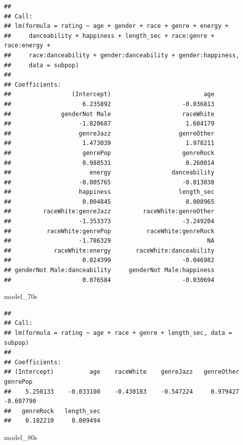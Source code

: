 \documentclass[
]{article}
\newenvironment{Shaded}{\begin{snugshade}}{\end{snugshade}}
\newcommand{\NormalTok}[1]{#1}
\begin{document}
\begin{verbatim}
## 
## Call:
## lm(formula = rating ~ age + gender + race + genre + energy + 
##     danceability + happiness + length_sec + race:genre + race:energy + 
##     race:danceability + gender:danceability + gender:happiness, 
##     data = subpop)
## 
## Coefficients:
##                 (Intercept)                          age  
##                    6.235892                    -0.036813  
##              genderNot Male                    raceWhite  
##                   -1.820687                     1.604179  
##                   genreJazz                   genreOther  
##                    1.473039                     1.978211  
##                    genrePop                    genreRock  
##                    0.988531                     0.260014  
##                      energy                 danceability  
##                   -0.005765                    -0.013030  
##                   happiness                   length_sec  
##                    0.004845                     0.008965  
##         raceWhite:genreJazz         raceWhite:genreOther  
##                   -1.353373                    -3.249204  
##          raceWhite:genrePop          raceWhite:genreRock  
##                   -1.786329                           NA  
##            raceWhite:energy       raceWhite:danceability  
##                    0.024399                    -0.046982  
## genderNot Male:danceability     genderNot Male:happiness  
##                    0.076584                    -0.030694
\end{verbatim}

\begin{Shaded}
\begin{Highlighting}[]
\NormalTok{model\_70s }
\end{Highlighting}
\end{Shaded}

\begin{verbatim}
## 
## Call:
## lm(formula = rating ~ age + race + genre + length_sec, data = subpop)
## 
## Coefficients:
## (Intercept)          age    raceWhite    genreJazz   genreOther     genrePop  
##    5.250133    -0.033100    -0.430183    -0.547224     0.979427    -0.607790  
##   genreRock   length_sec  
##    0.182210     0.009494
\end{verbatim}

\begin{Shaded}
\begin{Highlighting}[]
\NormalTok{model\_80s }
\end{Highlighting}
\end{Shaded}
\end{document}
